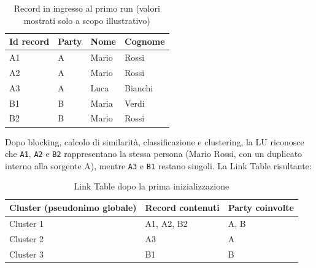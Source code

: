 \documentclass[11pt,a4paper]{article}
\begin{document}
\begin{table}[h!]
\centering
\caption{Record in ingresso al primo run (valori mostrati solo a scopo
illustrativo)}
\begin{tabular}{@{}llll@{}}
\toprule
\textbf{Id record} & \textbf{Party} & \textbf{Nome} & \textbf{Cognome} \\
\midrule
A1 & A & Mario   & Rossi \\
A2 & A & Mario   & Rossi \\
A3 & A & Luca    & Bianchi \\
B1 & B & Maria   & Verdi \\
B2 & B & Mario   & Rossi \\
\bottomrule
\end{tabular}
\end{table}

Dopo blocking, calcolo di similarit\`a, classificazione e clustering, la LU
riconosce che \texttt{A1}, \texttt{A2} e \texttt{B2} rappresentano la stessa
persona (Mario Rossi, con un duplicato interno alla sorgente A), mentre
\texttt{A3} e \texttt{B1} restano singoli. La Link Table risultante:

\begin{table}[h!]
\centering
\caption{Link Table dopo la prima inizializzazione}
\begin{tabular}{@{}lll@{}}
\toprule
\textbf{Cluster (pseudonimo globale)} & \textbf{Record contenuti} & \textbf{Party coinvolte} \\
\midrule
Cluster 1 & A1, A2, B2 & A, B \\
Cluster 2 & A3         & A \\
Cluster 3 & B1         & B \\
\bottomrule
\end{tabular}
\end{table}
\end{document}
